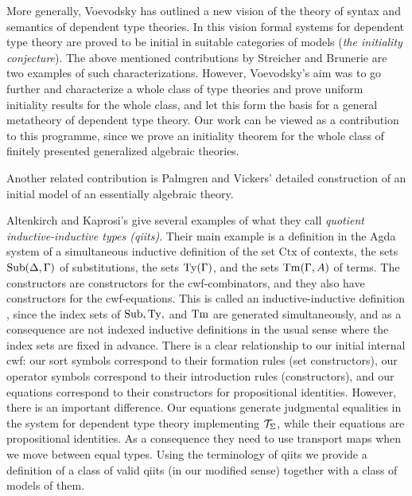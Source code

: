 \documentclass{lmcs}
\def\Ctx{\mathrm{Ctx}}
\begin{document}
More generally, Voevodsky \cite{voevodsky:initiality} has outlined a new vision of the theory of syntax and semantics of dependent type theories. In this vision formal systems for dependent type theory are proved to be initial in suitable categories of models ({\em the initiality conjecture}). The above mentioned contributions by Streicher and Brunerie are two examples of such characterizations. However, Voevodsky's aim was to go further and characterize a whole class of type theories and prove uniform initiality results for the whole class, and let this form the basis for a general metatheory of dependent type theory. Our work can be viewed as a contribution to this programme, since we prove an initiality theorem for the whole class of finitely presented generalized algebraic theories.

Another related contribution is Palmgren and Vickers' \cite{palmgrenvickers} detailed construction of 
an initial model of an essentially algebraic theory.

Altenkirch and Kaprosi's \cite{altenkirch:qiits} give several examples of what they call {\em quotient inductive-inductive types (qiits)}. Their main example is a definition in the Agda system \cite{agda-wiki} of a simultaneous inductive definition of the set $\Ctx$ of contexts, the sets $\mathrm{Sub}(\Delta,\Gamma)$ of substitutions, the sets $\mathrm{Ty}(\Gamma)$, and the sets $\mathrm{Tm}(\Gamma,A)$ of terms. The constructors are constructors for the cwf-combinators, and they also have constructors for the cwf-equations. This is called an inductive-inductive definition \cite{nordvallforsberg:iids}, since the index sets of $\mathrm{Sub}, \mathrm{Ty},$ and $\mathrm{Tm}$ are generated simultaneously, and as a consequence are not indexed inductive definitions in the usual sense where the index sets are fixed in advance. There is a clear relationship to our initial internal cwf: our sort symbols correspond to their formation rules (set constructors), our operator symbols correspond to their introduction rules (constructors), and our equations correspond to their constructors for propositional identities. However, there is an important difference. Our equations generate judgmental equalities in the system for dependent type theory implementing ${\mathcal T}_\Sigma$, while their equations are propositional identities. As a consequence they need to use transport maps when we move between equal types. Using the terminology of qiits we provide a definition of a class of valid qiits (in our modified sense) together with a class of models of them.





%
\end{document}
